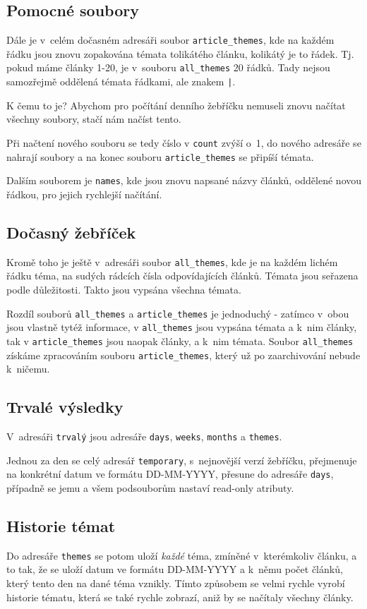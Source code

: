 \documentclass[12pt]{amsart}
\begin{document}
\subsection{Pomocné soubory}
Dále je v~celém dočasném adresáři soubor \texttt{article\_themes}, kde na každém řádku jsou znovu zopakována témata tolikátého článku, kolikátý je to řádek. Tj. pokud máme články 1-20, je v~souboru \texttt{all\_themes} 20 řádků. Tady nejsou samozřejmě oddělená témata řádkami, ale znakem \verb,|,.

K čemu to je? Abychom pro počítání denního žebříčku nemuseli znovu načítat všechny soubory, stačí nám načíst tento. 

Při načtení nového souboru se tedy číslo v \texttt{count} zvýší o~1, do nového adresáře se nahrají soubory a na konec souboru \texttt{article\_themes} se připíší témata.

Dalším souborem je \texttt{names}, kde jsou znovu napsané názvy článků, oddělené novou řádkou, pro jejich rychlejší načítání.


\subsection{Dočasný žebříček}

Kromě toho je ještě v~adresáři soubor \texttt{all\_themes}, kde je na každém lichém řádku téma, na sudých rádcích čísla odpovídajících článků. Témata jsou seřazena podle důležitosti. Takto jsou vypsána všechna témata.

Rozdíl souborů \texttt{all\_themes} a \texttt{article\_themes} je jednoduchý - zatímco v~obou jsou vlastně tytéž informace, v \texttt{all\_themes} jsou vypsána témata a k~nim články, tak v \texttt{article\_themes} jsou naopak články, a k~nim témata. Soubor \texttt{all\_themes} získáme zpracováním souboru \texttt{article\_themes}, který už po zaarchivování nebude k~ničemu.

\subsection{Trvalé výsledky}
V~adresáři \texttt{trvalý} jsou adresáře \texttt{days}, \texttt{weeks}, \texttt{months} a \texttt{themes}.

Jednou za den se celý adresář \texttt{temporary}, s~nejnovější verzí žebříčku, přejmenuje na konkrétní datum ve formátu DD-MM-YYYY, přesune do adresáře \texttt{days}, případně se jemu a všem podsouborům nastaví read-only atributy.

\subsection{Historie témat}
\label{ukladanitemat}
Do adresáře \texttt{themes} se potom uloží \emph{každé} téma, zmíněné v~kterémkoliv článku, a to tak, že se uloží datum ve formátu DD-MM-YYYY a k~němu počet článků, který tento den na dané téma vznikly. Tímto způsobem se velmi rychle vyrobí historie tématu, která se také rychle zobrazí, aniž by se načítaly všechny články.
\end{document}
